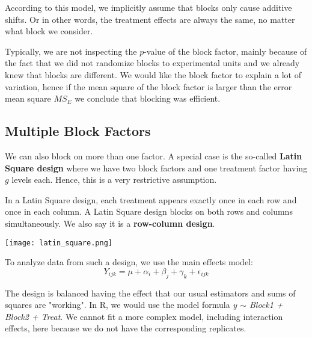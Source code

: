 According to this model, we implicitly assume that blocks only cause additive shifts. Or in other words, the treatment effects are always the same, no matter what block we consider.\medskip

Typically, we are not inspecting the $p$-value of the block factor, mainly because of the fact that we did not randomize blocks to experimental units and we already knew that blocks are different. We would like the block factor to explain a lot of variation, hence if the mean square of the block factor is larger than the error mean square $MS_E$ we conclude that blocking was efficient.


\subsection{Multiple Block Factors}

We can also block on more than one factor. A special case is the so-called \textbf{Latin Square design} where we have two block factors and one treatment factor having $g$ levels each. Hence, this is a very restrictive assumption. \medskip

In a Latin Square design, each treatment appears exactly once in each row and once in each column. A Latin Square design blocks on both rows and columns simultaneously. We also say it is a \textbf{row-column design}.
\begin{center}
	\texttt{[image: latin\_square.png]}
\end{center}

To analyze data from such a design, we use the main effects model:
$$Y_{ijk} = \mu + \alpha_i + \beta_j + \gamma_k + \epsilon_{ijk}$$

The design is balanced having the effect that our usual estimators and sums of squares are "working". In R, we would use the model formula \textit{y $\sim$ Block1 + Block2 + Treat}. We cannot fit a more complex model, including interaction effects, here because we do not have the corresponding replicates.